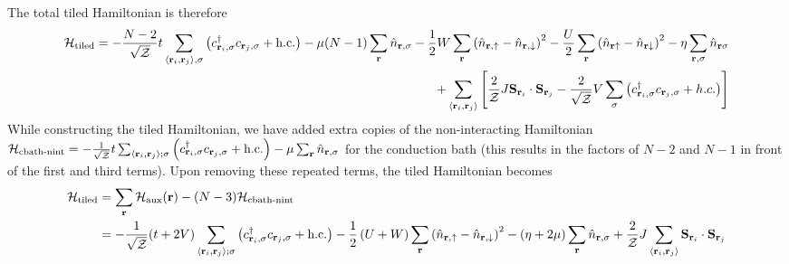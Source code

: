 \documentclass[reprint,hidelinks,onecolumn]{revtex4-2}
\begin{document}
The total tiled Hamiltonian is therefore
\begin{equation}\begin{aligned}
	\mathcal{H}_\text{tiled} = -\frac{N-2}{\sqrt\mathcal{Z}}t\sum_{\left<{\bf r}_i, {\bf r}_j\right>,\sigma}\left(c^\dagger_{{\bf r}_i,\sigma}c_{{\bf r}_j,\sigma} + \text{h.c.}\right) - \mu (N-1) \sum_{{\bf r}}\hat n_{{\bf r},\sigma} - \frac{1}{2}W\sum_{\bf r}\left(\hat n_{{\bf r} , \uparrow} - \hat n_{{\bf r} , \downarrow}\right)^2  -\frac{U}{2}\sum_{{\bf r}}\left(\hat n_{{\bf r} \uparrow} - \hat n_{{\bf r} \downarrow} \right)^2 - \eta\sum_{{\bf r},\sigma} \hat n_{{\bf r}\sigma}\\
	+ \sum_{\left< {\bf r}_i, {\bf r}_j\right>}\left[\frac{2}{\mathcal{Z}}J {\bf S}_{{\bf r}_i}\cdot{\bf S}_{{\bf r}_j} - \frac{2}{\sqrt\mathcal{Z}}V \sum_{\sigma}\left(c^\dagger_{{\bf r}_i,\sigma} c_{{{\bf r}_j},\sigma} + h.c.\right)\right]
\end{aligned}\end{equation}
While constructing the tiled Hamiltonian, we have added extra copies of the non-interacting Hamiltonian \(\mathcal{H}_\text{cbath-nint} = -\frac{1}{\sqrt\mathcal{Z}}t\sum_{\left<{\bf r}_i, {\bf r}_j\right>;\sigma}\left(c^\dagger_{{\bf r}_i,\sigma}c_{{\bf r}_j,\sigma} + \text{h.c.}\right) - \mu \sum_{{\bf r}}\hat n_{{\bf r},\sigma}\) for the conduction bath (this results in the factors of \(N-2\) and \(N-1\) in front of the first and third terms). Upon removing these repeated terms, the tiled Hamiltonian becomes
\begin{equation}\begin{aligned}
	\mathcal{H}_\text{tiled} &= \sum_{{\bf r}}\mathcal{H}_\text{aux}({\bf r}) - (N-3)\mathcal{H}_\text{cbath-nint}\\
							 &= -\frac{1}{\sqrt\mathcal{Z}}(t + 2V)\sum_{\left<{\bf r}_i, {\bf r}_j\right>;\sigma}\left(c^\dagger_{{\bf r}_i,\sigma}c_{{\bf r}_j,\sigma} + \text{h.c.}\right) - \frac{1}{2}\left(U + W\right)\sum_{\bf r}\left(\hat n_{{\bf r} , \uparrow} - \hat n_{{\bf r} , \downarrow}\right)^2 - \left(\eta + 2\mu\right) \sum_{{\bf r}}\hat n_{{\bf r},\sigma} + \frac{2}{\mathcal{Z}}J\sum_{\left< {\bf r}_i, {\bf r}_j\right>} {\bf S}_{{\bf r}_i}\cdot{\bf S}_{{\bf r}_j}
\end{aligned}\end{equation}
\end{document}
